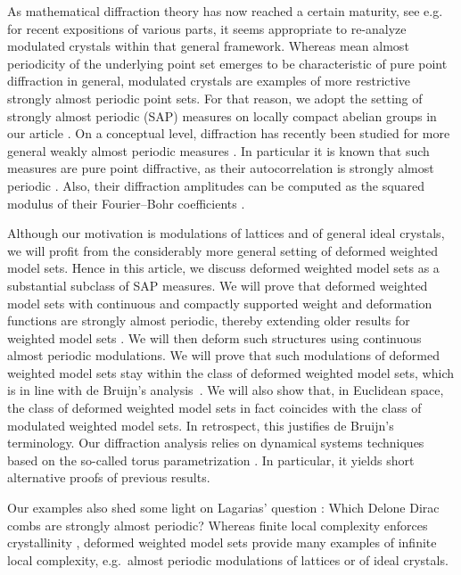 \documentclass[11pt, a4wide]{amsart}
\numberwithin{lemma}{section}
\begin{document}
\smallskip

As mathematical diffraction theory has now reached a certain maturity, see e.g.~\cite{BG2,MoSt,LenStr16,RS17} for recent expositions of various parts, it seems appropriate to re-analyze modulated crystals within that general framework. Whereas mean almost periodicity of the underlying point set emerges to be characteristic of pure point diffraction in general, modulated crystals are examples of more restrictive strongly almost periodic point sets. For that reason, we adopt the setting of strongly almost periodic (SAP) measures on locally compact abelian groups in our article \cite{GdeL,MoSt}. On a conceptual level, diffraction has recently been studied for more general weakly almost periodic measures \cite{LenStr16}. In particular it is known that such measures are pure point diffractive, as their autocorrelation is strongly almost periodic \cite[Thm.~7.5(a)]{LenStr16}.
 Also, their diffraction amplitudes can be computed as the squared modulus of their Fourier--Bohr coefficients \cite[Thm.~7.5(b)]{LenStr16}.
 
 \smallskip

Although our motivation is modulations of lattices and of general ideal crystals, we will profit from the considerably more general setting of deformed weighted model sets.
Hence in this article, we discuss  deformed weighted model sets as a substantial subclass of SAP measures.
We will prove that deformed weighted model sets with continuous and compactly supported weight and deformation functions are strongly almost periodic, thereby extending older results for weighted model sets \cite{BM,LR,Ric,NS11,NS12}.
We will then deform such structures using continuous almost periodic modulations.
We will prove that such modulations of deformed weighted model sets stay within the class of deformed weighted model sets, which is in line with de Bruijn's analysis~\cite{dB87}.
We will also show that, in Euclidean space, the class of deformed weighted model sets in fact coincides with the class of modulated weighted model sets. In retrospect, this justifies de Bruijn's terminology. Our diffraction analysis relies on dynamical systems techniques based on the so-called torus parametrization \cite{BHP,Ro96,Martin2,LR,KR,KR17}. In particular, it yields short alternative proofs of previous results.

\smallskip

Our examples also shed some light on Lagarias' question  \cite{Lag}: Which Delone Dirac combs are strongly almost periodic? Whereas finite local complexity enforces crystallinity \cite[Cor.~5.6]{KL13}, deformed weighted model sets provide many examples of infinite local complexity, e.g.~almost periodic modulations of lattices or of ideal crystals.
\end{document}
